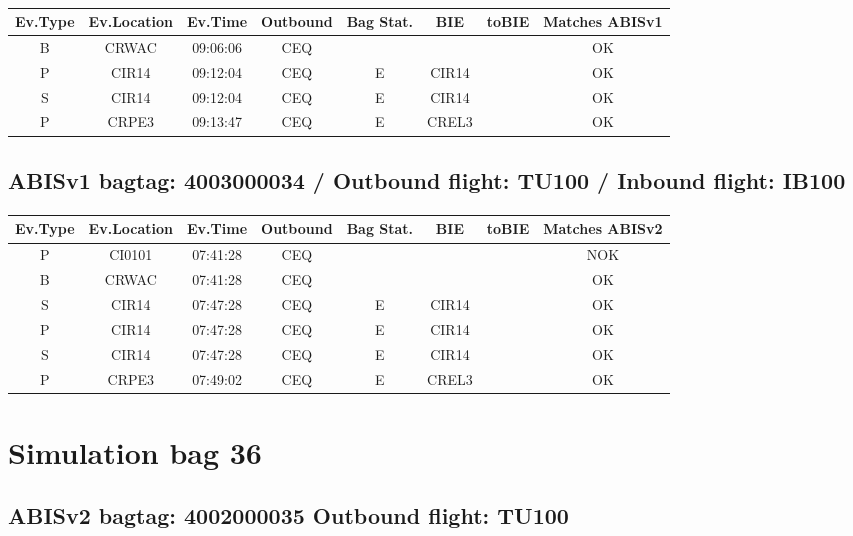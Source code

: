\documentclass{report}
\begin{document}
\paragraph{}
\begin{longtable}{cccccccc}    \toprule
\rowcolor{white!50}
\textbf{Ev.Type} & \textbf{Ev.Location} & \textbf{Ev.Time} & \textbf{Outbound} & \textbf{Bag Stat.} & \textbf{BIE} & \textbf{toBIE} & \textbf{Matches ABISv1} \\\midrule
B & CRWAC & 09:06:06  & CEQ &  &  &  & OK\\
P & CIR14 & 09:12:04  & CEQ & E & CIR14 &  & OK\\
S & CIR14 & 09:12:04  & CEQ & E & CIR14 &  & OK\\
P & CRPE3 & 09:13:47  & CEQ & E & CREL3 &  & OK\\
\bottomrule
\end{longtable}
\subsection*{ABISv1 bagtag: 4003000034 / Outbound flight: TU100 / Inbound flight: IB100}
\paragraph{}
\begin{longtable}{cccccccc}    \toprule
\rowcolor{white!50}
\textbf{Ev.Type} & \textbf{Ev.Location} & \textbf{Ev.Time} & \textbf{Outbound} & \textbf{Bag Stat.} & \textbf{BIE} & \textbf{toBIE} & \textbf{Matches ABISv2} \\\midrule
P & CI0101 & 07:41:28  & CEQ &  &  &  & NOK\\
B & CRWAC & 07:41:28  & CEQ &  &  &  & OK\\
S & CIR14 & 07:47:28  & CEQ & E & CIR14 &  & OK\\
P & CIR14 & 07:47:28  & CEQ & E & CIR14 &  & OK\\
S & CIR14 & 07:47:28  & CEQ & E & CIR14 &  & OK\\
P & CRPE3 & 07:49:02  & CEQ & E & CREL3 &  & OK\\
\bottomrule
\end{longtable}
\pagebreak
\section*{Simulation bag 36}
\subsection*{ABISv2 bagtag: 4002000035 Outbound flight: TU100}
\end{document}
